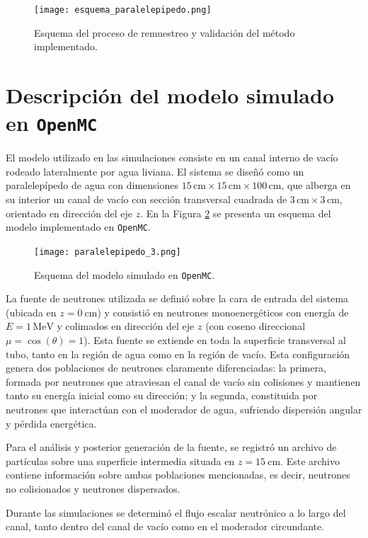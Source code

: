 \begin{figure}[h]
    \centering
    \texttt{[image: esquema\_paralelepipedo.png]}
    \caption{Esquema del proceso de remuestreo y validación del método implementado.}
    \label{fig:esquema_remuestreo}
\end{figure}

\section{Descripción del modelo simulado en \texttt{OpenMC}}

El modelo utilizado en las simulaciones consiste en un canal interno de vacío rodeado lateralmente por agua liviana. El sistema se diseñó como un paralelepípedo de agua con dimensiones $15\,\text{cm} \times 15\,\text{cm} \times 100\,\text{cm}$, que alberga en su interior un canal de vacío con sección transversal cuadrada de $3\,\text{cm} \times 3\,\text{cm}$, orientado en dirección del eje $z$. En la Figura \ref{fig:modelo_simulado_openmc} se presenta un esquema del modelo implementado en \texttt{OpenMC}.

\begin{figure}[h]
    \centering
    \texttt{[image: paralelepipedo\_3.png]}
    \caption{Esquema del modelo simulado en \texttt{OpenMC}.}
    \label{fig:modelo_simulado_openmc}
\end{figure}

La fuente de neutrones utilizada se definió sobre la cara de entrada del sistema (ubicada en $z = 0~\text{cm}$) y consistió en neutrones monoenergéticos con energía de $E = 1\,\text{MeV}$ y colimados en dirección del eje $z$ (con coseno direccional $\mu = \cos(\theta) = 1$). Esta fuente se extiende en toda la superficie transversal al tubo, tanto en la región de agua como en la región de vacío. Esta configuración genera dos poblaciones de neutrones claramente diferenciadas: la primera, formada por neutrones que atraviesan el canal de vacío sin colisiones y mantienen tanto su energía inicial como su dirección; y la segunda, constituida por neutrones que interactúan con el moderador de agua, sufriendo dispersión angular y pérdida energética.

Para el análisis y posterior generación de la fuente, se registró un archivo de partículas sobre una superficie intermedia situada en $z = 15~\text{cm}$. Este archivo contiene información sobre ambas poblaciones mencionadas, es decir, neutrones no colisionados y neutrones dispersados.

Durante las simulaciones se determinó el flujo escalar neutrónico a lo largo del canal, tanto dentro del canal de vacío como en el moderador circundante.

